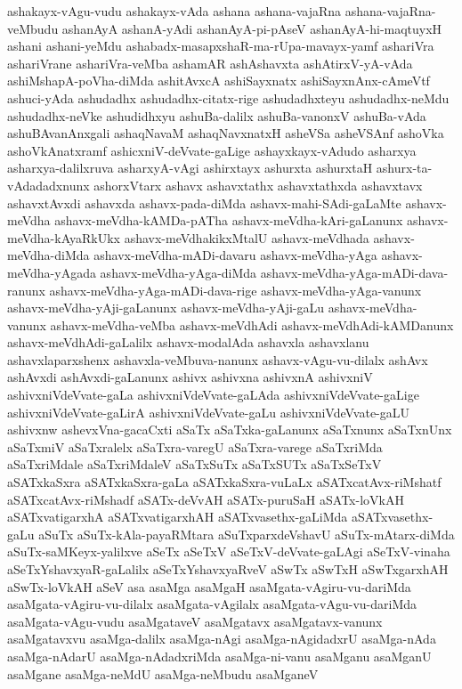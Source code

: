 {ashakayx-vAgu-vudu
ashakayx-vAda
ashana
ashana-vajaRna
ashana-vajaRna-veMbudu
ashanAyA
ashanA-yAdi
ashanAyA-pi-pAseV
ashanAyA-hi-maqtuyxH
ashani
ashani-yeMdu
ashabadx-masapxshaR-ma-rUpa-mavayx-yamf
ashariVra
ashariVrane
ashariVra-veMba
ashamAR
ashAshavxta
ashAtirxV-yA-vAda
ashiMshapA-poVha-diMda
ashitAvxcA
ashiSayxnatx
ashiSayxnAnx-cAmeVtf
ashuci-yAda
ashudadhx
ashudadhx-citatx-rige
ashudadhxteyu
ashudadhx-neMdu
ashudadhx-neVke
ashudidhxyu
ashuBa-dalilx
ashuBa-vanonxV
ashuBa-vAda
ashuBAvanAnxgali
ashaqNavaM
ashaqNavxnatxH
asheVSa
asheVSAnf
ashoVka
ashoVkAnatxramf
ashicxniV-deVvate-gaLige
ashayxkayx-vAdudo
asharxya
asharxya-dalilxruva
asharxyA-vAgi
ashirxtayx
ashurxta
ashurxtaH
ashurx-ta-vAdadadxnunx
ashorxVtarx
ashavx
ashavxtathx
ashavxtathxda
ashavxtavx
ashavxtAvxdi
ashavxda
ashavx-pada-diMda
ashavx-mahi-SAdi-gaLaMte
ashavx-meVdha
ashavx-meVdha-kAMDa-pATha
ashavx-meVdha-kAri-gaLanunx
ashavx-meVdha-kAyaRkUkx
ashavx-meVdhakikxMtalU
ashavx-meVdhada
ashavx-meVdha-diMda
ashavx-meVdha-mADi-davaru
ashavx-meVdha-yAga
ashavx-meVdha-yAgada
ashavx-meVdha-yAga-diMda
ashavx-meVdha-yAga-mADi-dava-ranunx
ashavx-meVdha-yAga-mADi-dava-rige
ashavx-meVdha-yAga-vanunx
ashavx-meVdha-yAji-gaLanunx
ashavx-meVdha-yAji-gaLu
ashavx-meVdha-vanunx
ashavx-meVdha-veMba
ashavx-meVdhAdi
ashavx-meVdhAdi-kAMDanunx
ashavx-meVdhAdi-gaLalilx
ashavx-modalAda
ashavxla
ashavxlanu
ashavxlaparxshenx
ashavxla-veMbuva-nanunx
ashavx-vAgu-vu-dilalx
ashAvx
ashAvxdi
ashAvxdi-gaLanunx
ashivx
ashivxna
ashivxnA
ashivxniV
ashivxniVdeVvate-gaLa
ashivxniVdeVvate-gaLAda
ashivxniVdeVvate-gaLige
ashivxniVdeVvate-gaLirA
ashivxniVdeVvate-gaLu
ashivxniVdeVvate-gaLU
ashivxnw
ashevxVna-gacaCxti
aSaTx
aSaTxka-gaLanunx
aSaTxnunx
aSaTxnUnx
aSaTxmiV
aSaTxralelx
aSaTxra-varegU
aSaTxra-varege
aSaTxriMda
aSaTxriMdale
aSaTxriMdaleV
aSaTxSuTx
aSaTxSUTx
aSaTxSeTxV
aSATxkaSxra
aSATxkaSxra-gaLa
aSATxkaSxra-vuLaLx
aSATxcatAvx-riMshatf
aSATxcatAvx-riMshadf
aSATx-deVvAH
aSATx-puruSaH
aSATx-loVkAH
aSATxvatigarxhA
aSATxvatigarxhAH
aSATxvasethx-gaLiMda
aSATxvasethx-gaLu
aSuTx
aSuTx-kAla-payaRMtara
aSuTxparxdeVshavU
aSuTx-mAtarx-diMda
aSuTx-saMKeyx-yalilxve
aSeTx
aSeTxV
aSeTxV-deVvate-gaLAgi
aSeTxV-vinaha
aSeTxYshavxyaR-gaLalilx
aSeTxYshavxyaRveV
aSwTx
aSwTxH
aSwTxgarxhAH
aSwTx-loVkAH
aSeV
asa
asaMga
asaMgaH
asaMgata-vAgiru-vu-dariMda
asaMgata-vAgiru-vu-dilalx
asaMgata-vAgilalx
asaMgata-vAgu-vu-dariMda
asaMgata-vAgu-vudu
asaMgataveV
asaMgatavx
asaMgatavx-vanunx
asaMgatavxvu
asaMga-dalilx
asaMga-nAgi
asaMga-nAgidadxrU
asaMga-nAda
asaMga-nAdarU
asaMga-nAdadxriMda
asaMga-ni-vanu
asaMganu
asaMganU
asaMgane
asaMga-neMdU
asaMga-neMbudu
asaMganeV
}
